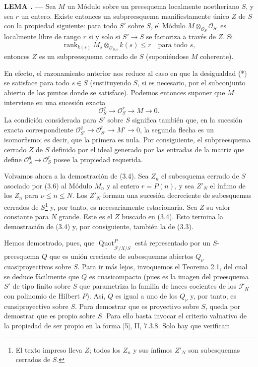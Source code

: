 \documentclass[11pt,twoside,openany]{book}
\numberwithin{equation}{section}
\newcommand{\src}[1]{%
  \phantomsection\hypertarget{src:#1}{}%
  \marginpar{\raggedleft\footnotesize\sffamily #1}%
}
\theoremstyle{plain}
\theoremstyle{definition}
\theoremstyle{remark}
\newcommand{\result}[2]{%
  \par\medskip\noindent\textbf{#1%
  \if\relax\detokenize{#2}\relax\else\space#2\fi. ---}\enspace
}
\newcommand{\FgaUnitKey}{frontmatter}
\renewcommand{\src}[1]{%
  \phantomsection\hypertarget{src:\FgaUnitKey:#1}{}%
  \marginpar{\raggedleft\footnotesize\sffamily #1}%
}
\theoremstyle{plain}
\theoremstyle{definition}
\theoremstyle{remark}
\begin{document}
\result{LEMA}{3.6} Sea $M$ un Módulo sobre un preesquema localmente
noetheriano $S$, y sea $r$ un entero. Existe entonces un subpreesquema
manifiestamente único $Z$ de $S$ con la propiedad siguiente: para todo $S'$
sobre $S$, el Módulo $M\otimes_{\mathcal O_S}\mathcal O_{S'}$ es localmente
libre de rango $r$ si y solo si $S'\longrightarrow S$ se factoriza a través de
$Z$. Si
\[
\operatorname{rank}_{k(s)}
M_s\otimes_{\mathcal O_{S,s}}k(s)\leq r
\quad\text{para todo $s$},
\]
entonces $Z$ es un subpreesquema cerrado de $S$ (suponiéndose $M$ coherente).
\src{264}
En efecto, el razonamiento anterior nos reduce al caso en que la desigualdad
(*) se satisface para todo $s\in S$ (sustituyendo $S$, si es necesario, por el
subconjunto abierto de los puntos donde se satisface). Podemos entonces suponer
que $M$ interviene en una sucesión exacta
\[
\mathcal O_S^q\longrightarrow\mathcal O_S^r\longrightarrow M\longrightarrow0.
\]
La condición considerada para $S'$ sobre $S$ significa también que, en la
sucesión exacta correspondiente
$\mathcal O_{S'}^q\longrightarrow\mathcal O_{S'}^r
\longrightarrow M'\longrightarrow0$, la segunda flecha es un isomorfismo; es
decir, que la primera es nula. Por consiguiente, el subpreesquema cerrado $Z$
de $S$ definido por el ideal generado por las entradas de la matriz que define
$\mathcal O_S^q\longrightarrow\mathcal O_S^r$ posee la propiedad requerida.

Volvamos ahora a la demostración de (3.4). Sea $Z_n$ el subesquema cerrado de
$S$ asociado por (3.6) al Módulo $M_n$ y al entero $r=P(n)$, y sea $Z'_N$ el
ínfimo de los $Z_n$ para $\nu\leq n\leq N$. Los $Z'_N$ forman una sucesión
decreciente de subesquemas cerrados de $S$\footnote{El texto impreso lleva $Z$; todos los $Z_n$ y sus ínfimos $Z'_N$ son subesquemas cerrados de $S$.} y, por tanto, es necesariamente
estacionaria. Sea $Z$ su valor constante para $N$ grande. Este es el $Z$
buscado en (3.4). Esto termina la demostración de (3.4) y, por consiguiente,
también la de (3.3).

Hemos demostrado, pues, que
$\underline{\operatorname{Quot}}^P_{\mathcal F/X/S}$ está representado por un
$S$-preesquema $Q$ que es unión creciente de subesquemas abiertos $Q_\nu$
cuasiproyectivos sobre $S$. Para ir más lejos, invoquemos el Teorema 2.1, del
cual se deduce fácilmente que $Q$ es cuasicompacto (pues es la imagen del
preesquema $S'$ de tipo finito sobre $S$ que parametriza la familia de haces
cocientes de los $\mathcal F_K$ con polinomio de Hilbert $P$). Así, $Q$ es
igual a uno de los $Q_\nu$ y, por tanto, es cuasiproyectivo sobre $S$. Para
demostrar que es proyectivo sobre $S$, queda por demostrar que es propio sobre
$S$. Para ello basta invocar el criterio valuativo de la propiedad de ser
propio en la forma
[5], II, 7.3.8. Solo hay que verificar:
\end{document}
